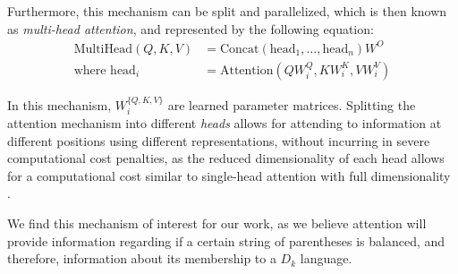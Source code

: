 Furthermore, this mechanism can be split and parallelized, which is then known as \emph{multi-head attention}, and represented by the following equation:
\begin{equation} \label{eq:multihead-attn}
    \begin{split}
        \text{MultiHead}(Q, K, V) &= \text{Concat}(\text{head}_1, \dots, \text{head}_n)W^O \\
        \text{where head}_i &= \text{Attention}(QW_{i}^{Q}, KW_{i}^K, VW_{i}^V)
    \end{split}
\end{equation}

In this mechanism, $W_{i}^{\{Q, K, V\}}$ are learned parameter matrices. Splitting the attention mechanism into different \emph{heads} allows for attending to information at different positions using different representations, without incurring in severe computational cost penalties, as the reduced dimensionality of each head allows for a computational cost similar to single-head attention with full dimensionality \cite{attention_is_all_you_need}.

We find this mechanism of interest for our work, as we believe attention will provide information regarding if a certain string of parentheses is balanced, and therefore, information about its membership to a $D_k$ language.
